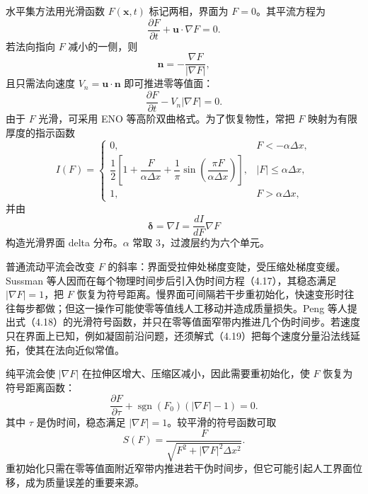 \documentclass[11pt,a4paper,openany,fontset=none]{ctexbook}
\begin{document}
水平集方法用光滑函数 $F(\bm x,t)$ 标记两相，界面为 $F=0$。其平流方程为
\begin{equation}
\frac{\partial F}{\partial t}+\bm u\cdot\nabla F=0.
\tag{4.12}
\end{equation}
若法向指向 $F$ 减小的一侧，则
\begin{equation}
\bm n=-\frac{\nabla F}{|\nabla F|},
\tag{4.13}
\end{equation}
且只需法向速度 $V_n=\bm u\cdot\bm n$ 即可推进零等值面：
\begin{equation}
\frac{\partial F}{\partial t}-V_n|\nabla F|=0.
\tag{4.14}
\end{equation}
由于 $F$ 光滑，可采用 ENO 等高阶双曲格式。为了恢复物性，常把 $F$ 映射为有限厚度的指示函数
\begin{equation}
I(F)=
\begin{cases}
0,&F<-\alpha\Delta x,\\
\dfrac12\left[1+\dfrac{F}{\alpha\Delta x}
+\dfrac1\pi\sin\!\left(\dfrac{\pi F}{\alpha\Delta x}\right)\right],
&|F|\leq\alpha\Delta x,\\
1,&F>\alpha\Delta x,
\end{cases}
\tag{4.15}
\end{equation}
并由
\begin{equation}
\bm\delta=\nabla I=\frac{dI}{dF}\nabla F
\tag{4.16}
\end{equation}
构造光滑界面 delta 分布。$\alpha$ 常取 3，过渡层约为六个单元。

普通流动平流会改变 $F$ 的斜率：界面受拉伸处梯度变陡，受压缩处梯度变缓。Sussman 等人因而在每个物理时间步后引入伪时间方程（4.17），其稳态满足 $|\nabla F|=1$，把 $F$ 恢复为符号距离。慢界面可间隔若干步重初始化，快速变形时往往每步都做；但这一操作可能使零等值线人工移动并造成质量损失。Peng 等人提出式（4.18）的光滑符号函数，并只在零等值面窄带内推进几个伪时间步。若速度只在界面上已知，例如凝固前沿问题，还须解式（4.19）把每个速度分量沿法线延拓，使其在法向近似常值。

纯平流会使 $|\nabla F|$ 在拉伸区增大、压缩区减小，因此需要重初始化，使 $F$ 恢复为符号距离函数：
\begin{equation}
\frac{\partial F}{\partial\tau}+\operatorname{sgn}(F_0)(|\nabla F|-1)=0.
\tag{4.17}
\end{equation}
其中 $\tau$ 是伪时间，稳态满足 $|\nabla F|=1$。较平滑的符号函数可取
\begin{equation}
S(F)=\frac{F}{\sqrt{F^2+|\nabla F|^2\Delta x^2}}.
\tag{4.18}
\end{equation}
重初始化只需在零等值面附近窄带内推进若干伪时间步，但它可能引起人工界面位移，成为质量误差的重要来源。
\end{document}
